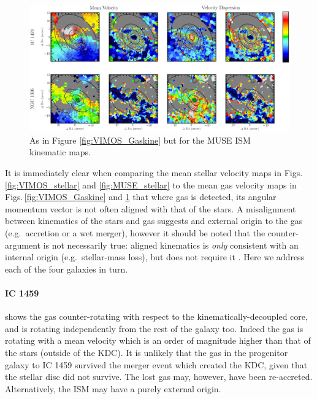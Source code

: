 	\begin{figure}
		\centering
		\includegraphics[height=0.31\textheight]{chapter5/muse/kin.png}
		\caption[MUSE ISM kinematic maps]{As in Figure \ref{fig:VIMOS_Gaskine} but for the MUSE ISM kinematic maps.}
		\label{fig:MUSE_Gaskine}
	\end{figure}


	It is immediately clear when comparing the mean stellar velocity maps in Figs.\,\ref{fig:VIMOS_stellar} and \ref{fig:MUSE_stellar} to the mean gas velocity maps in Figs.\,\ref{fig:VIMOS_Gaskine} and \ref{fig:MUSE_Gaskine} that where gas is detected, its angular momentum vector is not often aligned with that of the stars. A misalignment between kinematics of the stars and gas suggests and external origin to the gas (e.g.\ accretion or a wet merger), however it should be noted that the counter-argument is not necessarily true: aligned kinematics is \textit{only} consistent with an internal origin (e.g.\ stellar-mass loss), but does not require it \citep[e.g.][]{Davis2011a}. Here we address each of the four galaxies in turn. 

	\paragraph{IC 1459} shows the gas counter-rotating with respect to the kinematically-decoupled core, and is rotating independently from the rest of the galaxy too. Indeed the gas is rotating with a mean velocity which is an order of magnitude higher than that of the stars (outside of the KDC). It is unlikely that the gas in the progenitor galaxy to IC 1459 survived the merger event which created the KDC, given that the stellar disc did not survive. The lost gas may, however, have been re-accreted. Alternatively, the ISM may have a purely external origin. 

